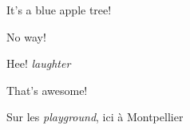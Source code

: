 \documentclass[11pt,a4paper]{article}
\begin{document}
It’s a blue apple tree!

No way!

Hee! \textit{laughter}

That’s awesome!

Sur les \textit{playground}, ici à Montpellier
\end{document}
